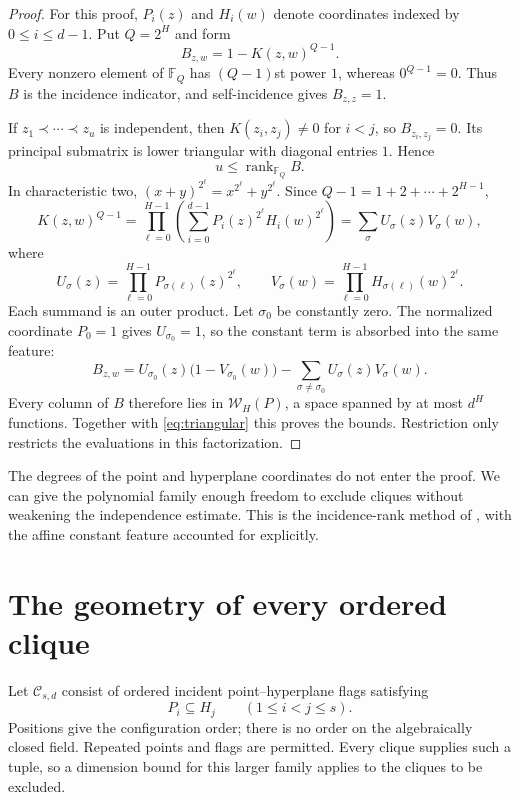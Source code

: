 \documentclass[11pt,a4paper]{article}
\newcommand{\F}{\mathbb F}
\newcommand{\Ccal}{\mathcal C}
\newcommand{\Wcal}{\mathcal W}
\DeclareMathOperator{\rank}{rank}
\theoremstyle{definition}
\theoremstyle{remark}
\numberwithin{equation}{section}
\begin{document}
\begin{proof}
For this proof, $P_i(z)$ and $H_i(w)$ denote coordinates indexed by $0\le i\le d-1$. Put $Q=2^H$ and form
\[
B_{z,w}=1-K(z,w)^{Q-1}.
\]
Every nonzero element of $\F_Q$ has $(Q-1)$st power $1$, whereas $0^{Q-1}=0$. Thus $B$ is the incidence indicator, and self-incidence gives $B_{z,z}=1$.

If $z_1\prec\cdots\prec z_u$ is independent, then $K(z_i,z_j)\ne0$ for $i<j$, so $B_{z_i,z_j}=0$. Its principal submatrix is lower triangular with diagonal entries $1$. Hence
\begin{equation}\label{eq:triangular}
u\le\rank_{\F_Q}B.
\end{equation}
In characteristic two, $(x+y)^{2^\ell}=x^{2^\ell}+y^{2^\ell}$. Since $Q-1=1+2+\cdots+2^{H-1}$,
\begin{equation}\label{eq:frobenius-factor}
K(z,w)^{Q-1}=
\prod_{\ell=0}^{H-1}\left(\sum_{i=0}^{d-1}P_i(z)^{2^\ell}H_i(w)^{2^\ell}\right)
=\sum_\sigma U_\sigma(z)V_\sigma(w),
\end{equation}
where
\[
U_\sigma(z)=\prod_{\ell=0}^{H-1}P_{\sigma(\ell)}(z)^{2^\ell},\qquad
V_\sigma(w)=\prod_{\ell=0}^{H-1}H_{\sigma(\ell)}(w)^{2^\ell}.
\]
Each summand is an outer product. Let $\sigma_0$ be constantly zero. The normalized coordinate $P_0=1$ gives $U_{\sigma_0}=1$, so the constant term is absorbed into the same feature:
\[
B_{z,w}=U_{\sigma_0}(z)\bigl(1-V_{\sigma_0}(w)\bigr)
-\sum_{\sigma\ne\sigma_0}U_\sigma(z)V_\sigma(w).
\]
Every column of $B$ therefore lies in $\Wcal_H(P)$, a space spanned by at most $d^H$ functions. Together with \eqref{eq:triangular} this proves the bounds. Restriction only restricts the evaluations in this factorization.
\end{proof}

The degrees of the point and hyperplane coordinates do not enter the proof. We can give the polynomial family enough freedom to exclude cliques without weakening the independence estimate. This is the incidence-rank method of \cite{IM}, with the affine constant feature accounted for explicitly.

\section{The geometry of every ordered clique}\label{sec:geometry}
Let $\Ccal_{s,d}$ consist of ordered incident point--hyperplane flags satisfying
\begin{equation}\label{eq:clique-config}
P_i\subseteq H_j\qquad(1\le i<j\le s).
\end{equation}
Positions give the configuration order; there is no order on the algebraically closed field. Repeated points and flags are permitted. Every clique supplies such a tuple, so a dimension bound for this larger family applies to the cliques to be excluded.
\end{document}
